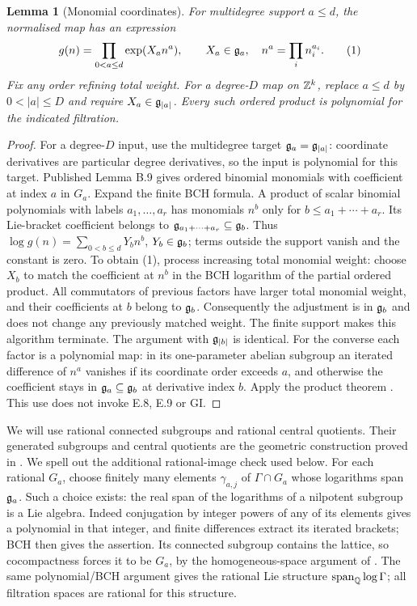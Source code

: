 \documentclass[11pt]{article}
\newtheorem{lemma}[theorem]{Lemma}
\begin{document}
\begin{lemma}[Monomial coordinates]\label{lem:monomial}
For multidegree support $a\leq d$, the normalised map has an expression
\[
 g(n)=\prod_{0<a\leq d}\exp(X_a n^a),\qquad X_a\in\mathfrak g_a,
 \quad n^a=\prod_i n_i^{a_i}.                 \tag{1}
\]
Fix any order refining total weight. For a degree-$D$ map on $\mathbb Z^k$,
replace $a\leq d$ by $0<|a|\leq D$ and require $X_a\in\mathfrak g_{|a|}$.
Every such ordered product is polynomial for the indicated filtration.
\end{lemma}
\begin{proof}
For a degree-$D$ input, use the multidegree target $\mathfrak g_a=\mathfrak g_{|a|}$:
coordinate derivatives are particular degree derivatives, so the input
is polynomial for this target. Published Lemma B.9 gives ordered
binomial monomials with coefficient
at index $a$ in $G_a$. Expand the finite BCH formula. A product of scalar
binomial polynomials with labels $a_1,\ldots,a_r$ has monomials $n^b$
only for $b\leq a_1+\cdots+a_r$. Its Lie-bracket coefficient belongs to
$\mathfrak g_{a_1+\cdots+a_r}\subseteq\mathfrak g_b$. Thus
$\log g(n)=\sum_{0<b\leq d}Y_b n^b$, $Y_b\in\mathfrak g_b$; terms outside the
support vanish and the constant is zero. To obtain (1), process increasing
total monomial weight: choose $X_b$ to match the coefficient at $n^b$ in
the BCH logarithm of the partial ordered product. All commutators of
previous factors have larger total monomial weight, and their coefficients
at $b$ belong to $\mathfrak g_b$. Consequently the adjustment is in $\mathfrak g_b$ and
does not change any previously matched weight. The finite support makes
this algorithm terminate. The argument with $\mathfrak g_{|b|}$ is identical.
For the converse each factor is a polynomial map: in its one-parameter
abelian subgroup an iterated difference of $n^a$ vanishes if its coordinate
order exceeds $a$, and otherwise the coefficient stays in
$\mathfrak g_a\subseteq\mathfrak g_b$ at derivative index $b$. Apply the product theorem
\cite[Corollary B.4]{GTZ}. This use does not invoke E.8, E.9 or GI.
\end{proof}

We will use rational connected subgroups and rational central quotients.
Their generated subgroups and central quotients are the geometric
construction proved in \cite[Section 2]{LP13}. We spell out the additional
rational-image check used below. For each rational $G_a$, choose finitely
many elements $\gamma_{a,j}$ of $\Gamma\cap G_a$ whose logarithms span
$\mathfrak g_a$. Such a choice exists: the real span of the logarithms of a
nilpotent subgroup is a Lie algebra. Indeed conjugation by integer powers
of any of its elements gives a polynomial in that integer, and finite
differences extract its iterated brackets; BCH then gives the assertion.
Its connected subgroup contains the lattice, so cocompactness forces it
to be $G_a$, by the homogeneous-space argument of \cite[Section 2]{LP13}.
The same polynomial/BCH argument gives the rational Lie structure
$\operatorname{span}_{\mathbb Q}\log\Gamma$; all filtration spaces are rational
for this structure.
\end{document}
